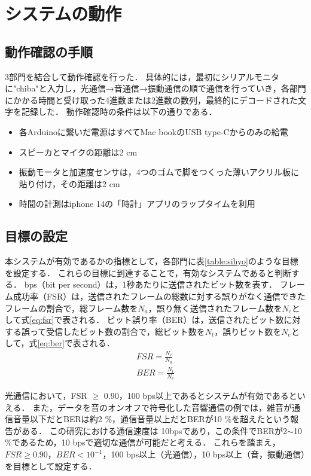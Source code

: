 \section{システムの動作}
\label{operation}
\subsection{動作確認の手順}
3部門を結合して動作確認を行った．
具体的には，最初にシリアルモニタに"chiba"と入力し，光通信→音通信→振動通信の順で通信を行っていき，各部門にかかる時間と受け取った4進数または2進数の数列，最終的にデコードされた文字を記録した．
動作確認時の条件は以下の通りである．
\begin{itemize}
    \item 各Arduinoに繋いだ電源はすべてMac bookのUSB type-Cからのみの給電
    \item スピーカとマイクの距離は2 cm
    \item 振動モータと加速度センサは，4つのゴムで脚をつくった薄いアクリル板に貼り付け，その距離は2 cm
    \item 時間の計測はiphone 14の「時計」アプリのラップタイムを利用
\end{itemize}

\subsection{目標の設定}
\label{target}
本システムが有効であるかの指標として，各部門に表\ref{table:sihyo}のような目標を設定する．
これらの目標に到達することで，有効なシステムであると判断する．
bps（bit per second）は，1秒あたりに送信されたビット数を表す．
フレーム成功率（FSR）は，送信されたフレームの総数に対する誤りがなく通信できたフレームの割合で，総フレーム数を$N_a$，誤り無く送信されたフレーム数を$N_c$として式\ref{eq:fsr}で表される．
ビット誤り率（BER）は，送信されたビット数に対する誤って受信したビット数の割合で，総ビット数を$N_t$，誤りビット数を$N_e$として，式\ref{eq:ber}で表される．
\begin{gather}
    FSR = \frac{N_c}{N_a} \label{eq:fsr} \\
    BER = \frac{N_t}{N_e} \label{eq:ber}
\end{gather}

光通信において，FSR $\geq$ 0.90，100 bps以上であるとシステムが有効であるといえる\cite{ref:fsr}\cite{ref:lifi}．
また，データを音のオンオフで符号化した音響通信の例では，雑音が通信音量以下だとBERは約2 \%，通信音量以上だとBERが10 \%を超えたという報告がある\cite{ref:ber}．
この研究\cite{ref:ber}における通信速度は 10bpsであり，この条件でBERが2$\sim$10 \%であるため，10 bpsで適切な通信が可能だと考える．
これらを踏まえ，$FSR \geq 0.90$，$BER < 10^{-1}$，100 bps以上（光通信），10 bps以上（音，振動通信）を目標として設定する．


